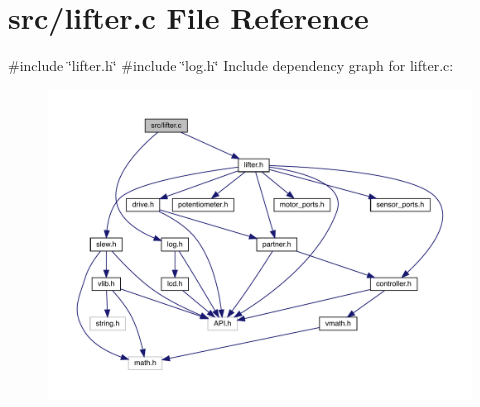 \section{src/lifter.c File Reference}
\label{lifter_8c}
{\ttfamily \#include \char`\"{}lifter.\+h\char`\"{}}\newline
{\ttfamily \#include \char`\"{}log.\+h\char`\"{}}\newline
Include dependency graph for lifter.\+c\+:
\nopagebreak
\begin{figure}[H]
\begin{center}
\leavevmode
\includegraphics[width=350pt]{lifter_8c__incl}
\end{center}
\end{figure}
